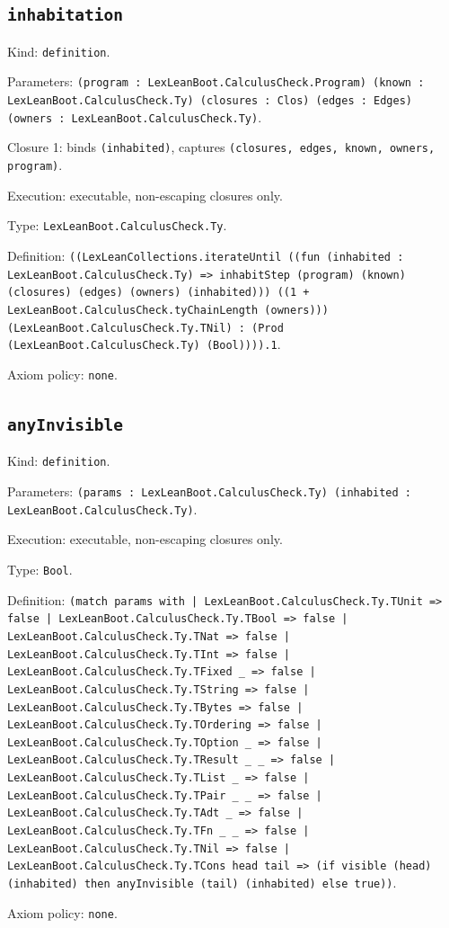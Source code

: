 \documentclass[11pt]{article}
\begin{document}
\subsection*{\texttt{inhabitation}}
\noindent Kind: \texttt{definition}.\par
\noindent Parameters: \texttt{(program : LexLeanBoot.CalculusCheck.Program) (known : LexLeanBoot.CalculusCheck.Ty) (closures : Clos) (edges : Edges) (owners : LexLeanBoot.CalculusCheck.Ty)}.\par
\noindent Closure 1: binds \texttt{(inhabited)}, captures \texttt{(closures, edges, known, owners, program)}.\par
\noindent Execution: executable, non-escaping closures only.\par
\noindent Type: \texttt{LexLeanBoot.CalculusCheck.Ty}.\par
\noindent Definition: \texttt{((LexLeanCollections.iterateUntil ((fun (inhabited : LexLeanBoot.CalculusCheck.Ty) => inhabitStep (program) (known) (closures) (edges) (owners) (inhabited))) ((1 + LexLeanBoot.CalculusCheck.tyChainLength (owners))) (LexLeanBoot.CalculusCheck.Ty.TNil) : (Prod (LexLeanBoot.CalculusCheck.Ty) (Bool)))).1}.\par
\noindent Axiom policy: \texttt{none}.\par
\subsection*{\texttt{anyInvisible}}
\noindent Kind: \texttt{definition}.\par
\noindent Parameters: \texttt{(params : LexLeanBoot.CalculusCheck.Ty) (inhabited : LexLeanBoot.CalculusCheck.Ty)}.\par
\noindent Execution: executable, non-escaping closures only.\par
\noindent Type: \texttt{Bool}.\par
\noindent Definition: \texttt{(match params with | LexLeanBoot.CalculusCheck.Ty.TUnit => false | LexLeanBoot.CalculusCheck.Ty.TBool => false | LexLeanBoot.CalculusCheck.Ty.TNat => false | LexLeanBoot.CalculusCheck.Ty.TInt => false | LexLeanBoot.CalculusCheck.Ty.TFixed \_ => false | LexLeanBoot.CalculusCheck.Ty.TString => false | LexLeanBoot.CalculusCheck.Ty.TBytes => false | LexLeanBoot.CalculusCheck.Ty.TOrdering => false | LexLeanBoot.CalculusCheck.Ty.TOption \_ => false | LexLeanBoot.CalculusCheck.Ty.TResult \_ \_ => false | LexLeanBoot.CalculusCheck.Ty.TList \_ => false | LexLeanBoot.CalculusCheck.Ty.TPair \_ \_ => false | LexLeanBoot.CalculusCheck.Ty.TAdt \_ => false | LexLeanBoot.CalculusCheck.Ty.TFn \_ \_ => false | LexLeanBoot.CalculusCheck.Ty.TNil => false | LexLeanBoot.CalculusCheck.Ty.TCons head tail => (if visible (head) (inhabited) then anyInvisible (tail) (inhabited) else true))}.\par
\noindent Axiom policy: \texttt{none}.\par
\end{document}
